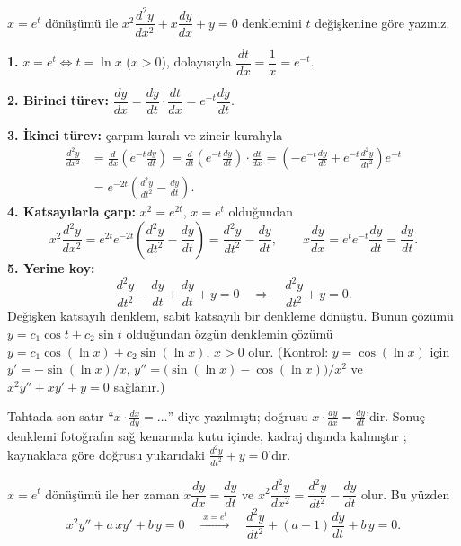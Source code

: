 \begin{soru}
$x=e^t$ dönüşümü ile $x^2\dfrac{d^2y}{dx^2}+x\dfrac{dy}{dx}+y=0$ denklemini $t$ değişkenine göre yazınız.
\end{soru}
\begin{cevap}
\textbf{1.} $x=e^t\iff t=\ln x$ ($x>0$), dolayısıyla $\dfrac{dt}{dx}=\dfrac1x=e^{-t}$.

\textbf{2. Birinci türev:} $\dfrac{dy}{dx}=\dfrac{dy}{dt}\cdot\dfrac{dt}{dx}=e^{-t}\dfrac{dy}{dt}$.

\textbf{3. İkinci türev:} çarpım kuralı ve zincir kuralıyla
\begin{align*}
\frac{d^2y}{dx^2}&=\frac{d}{dx}\left(e^{-t}\frac{dy}{dt}\right)=\frac{d}{dt}\left(e^{-t}\frac{dy}{dt}\right)\cdot\frac{dt}{dx}
=\left(-e^{-t}\frac{dy}{dt}+e^{-t}\frac{d^2y}{dt^2}\right)e^{-t}\\
&=e^{-2t}\left(\frac{d^2y}{dt^2}-\frac{dy}{dt}\right).
\end{align*}
\textbf{4. Katsayılarla çarp:} $x^2=e^{2t}$, $x=e^{t}$ olduğundan
\[
x^2\frac{d^2y}{dx^2}=e^{2t}e^{-2t}\left(\frac{d^2y}{dt^2}-\frac{dy}{dt}\right)=\frac{d^2y}{dt^2}-\frac{dy}{dt},\qquad
x\frac{dy}{dx}=e^{t}e^{-t}\frac{dy}{dt}=\frac{dy}{dt}.
\]
\textbf{5. Yerine koy:}
\[
\frac{d^2y}{dt^2}-\frac{dy}{dt}+\frac{dy}{dt}+y=0\quad\Longrightarrow\quad\boxed{\frac{d^2y}{dt^2}+y=0}.
\]
Değişken katsayılı denklem, sabit katsayılı bir denkleme dönüştü. Bunun çözümü $y=c_1\cos t+c_2\sin t$ olduğundan
özgün denklemin çözümü $y=c_1\cos(\ln x)+c_2\sin(\ln x)$, $x>0$ olur. (Kontrol: $y=\cos(\ln x)$ için
$y'=-\sin(\ln x)/x$, $y''=\big(\sin(\ln x)-\cos(\ln x)\big)/x^2$ ve $x^2y''+xy'+y=0$ sağlanır.)
\end{cevap}

\begin{bilgi}
Tahtada son satır ``$x\cdot\frac{dx}{dy}=\dots$'' diye yazılmıştı; doğrusu $x\cdot\frac{dy}{dx}=\frac{dy}{dt}$'dir.
Sonuç denklemi fotoğrafın sağ kenarında kutu içinde, kadraj dışında kalmıştır
; kaynaklara göre doğrusu yukarıdaki $\frac{d^2y}{dt^2}+y=0$'dır.
\end{bilgi}

\begin{teorem}
$x=e^t$ dönüşümü ile her zaman
$x\dfrac{dy}{dx}=\dfrac{dy}{dt}$ ve $x^2\dfrac{d^2y}{dx^2}=\dfrac{d^2y}{dt^2}-\dfrac{dy}{dt}$ olur. Bu yüzden
\[
x^2y''+a\,xy'+b\,y=0\quad\xrightarrow{\;x=e^t\;}\quad \frac{d^2y}{dt^2}+(a-1)\frac{dy}{dt}+b\,y=0 .
\]
\end{teorem}

